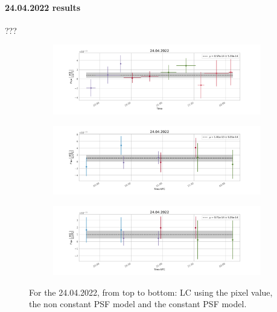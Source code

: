     \paragraph{24.04.2022 results}
    ???
        \begin{figure}[H]
        \centering
        \begin{subfigure}{\textwidth}
            \includegraphics[width=\textwidth]{report/Figures/results/lc_2404.png}
        \end{subfigure}%
        \hspace{1em}
        \begin{subfigure}{\textwidth}
            \centering
            \includegraphics[width=\textwidth]{report/Figures/results/lc_2404_notconst.png}
        \end{subfigure}
        \hspace{1em}
        \begin{subfigure}{\textwidth}
            \centering
            \includegraphics[width=\textwidth]{report/Figures/results/lc_2404_psf_const.png}
        \end{subfigure}
        \caption{For the 24.04.2022, from top to bottom: LC using the pixel value, the non constant PSF model and the constant PSF model.}
        \label{24_lc}
        \end{figure}

